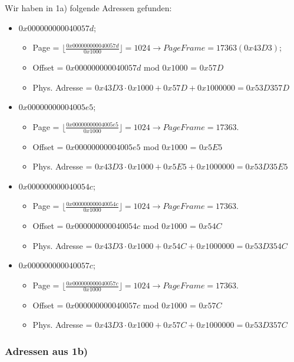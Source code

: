 Wir haben in 1a) folgende Adressen gefunden: 
\begin{itemize}
\item $0x000000000040057d$; 
	\begin{itemize}
		\item Page = $\lfloor \frac{0x000000000040057d}{0x1000} \rfloor = 1024 \rightarrow PageFrame = 17363 (0x43D3)$;  
		\item Offset = $0x000000000040057d$ mod $0x1000$  = $0x57D$
		\item Phys. Adresse = $0x43D3 \cdot 0x1000 + 0x57D + 0x1000000 = 0x53D357D$
	\end{itemize}
\item $0x00000000004005e5$; 
	\begin{itemize}
		\item Page = $\lfloor \frac{0x00000000004005e5}{0x1000} \rfloor = 1024 \rightarrow PageFrame = 17363$.
		\item Offset = $0x00000000004005e5$ mod $0x1000$  = $0x5E5$
		\item Phys. Adresse = $0x43D3 \cdot 0x1000 + 0x5E5 + 0x1000000 = 0x53D35E5$
	\end{itemize}
\item $0x000000000040054c$;
	\begin{itemize}
		\item  Page = $\lfloor \frac{0x000000000040054c}{0x1000} \rfloor = 1024 \rightarrow PageFrame = 17363$.
		\item Offset = $0x000000000040054c$ mod $0x1000$  = $0x54C$
		\item Phys. Adresse = $0x43D3 \cdot 0x1000 + 0x54C + 0x1000000 = 0x53D354C$
	\end{itemize}
\item $0x000000000040057c$;
	\begin{itemize}
		\item Page =  $\lfloor \frac{0x000000000040057c}{0x1000} \rfloor = 1024 \rightarrow PageFrame = 17363$.
		\item Offset = $0x000000000040057c$ mod $0x1000$  = $0x57C$
		\item Phys. Adresse = $0x43D3 \cdot 0x1000 + 0x57C + 0x1000000= 0x53D357C$
	\end{itemize}
\end{itemize}

\subsubsection{Adressen aus 1b)}

